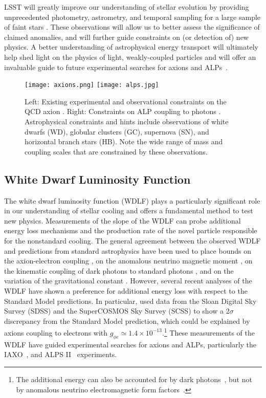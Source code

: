 LSST will greatly improve our understanding of stellar evolution by providing unprecedented photometry, astrometry, and temporal sampling for a large sample of faint stars \citep{0912.0201}.
These observations will allow us to better assess the significance of claimed anomalies, and will further guide constraints on (or detection of) new physics.
A better understanding of astrophysical energy transport will ultimately help shed light on the physics of light, weakly-coupled particles and will offer an invaluable guide to future experimental searches for axions and ALPs~\citep{Irastorza:2018dyq}.

\begin{figure}[t]
\centering
\texttt{[image: axions.png]}
\texttt{[image: alps.jpg]}
\caption{Left: Existing experimental and observational constraints on the QCD axion \citep{Redino:2015}.  
Right: Constraints on ALP coupling to photons \citep{Ringwald:2012}.
Astrophysical constraints and hints include observations of white dwarfs (WD), globular clusters (GC), supernova (SN), and horizontal branch stars (HB).
Note the wide range of mass and coupling scales that are constrained by these observations.
\label{fig:axions}
}
\end{figure}

\subsection{White Dwarf Luminosity Function}

The white dwarf luminosity function (WDLF) plays a particularly significant role in our understanding of stellar cooling and offers a fundamental method to test new physics.
Measurements of the slope of the WDLF can probe additional energy loss mechanisms and the production rate of the novel particle responsible for the nonstandard cooling.
The general agreement between the observed WDLF and predictions from standard astrophysics have been used to place bounds on the axion-electron coupling \citep{Isern:2008nt,Bertolami:2014wua}, on the anomalous neutrino magnetic moment \citep{Bertolami:2014noa}, on the kinematic coupling of dark photons to standard photons \citep{Chang:2016qfl}, and on the variation of the gravitational constant \citep{Althaus:2011ca}.
However, several recent analyses of the WDLF have shown a preference for additional energy loss with respect to the Standard Model predictions.
In particular, \cite{Bertolami:2014wua} used data from the Sloan Digital Sky Survey (SDSS) and the SuperCOSMOS Sky Survey (SCSS) to show a $2 \sigma$ discrepancy from the Standard Model prediction, which could be explained by axions coupling to electrons with $g_{\phi e}\simeq 1.4\times 10^{-13}$.\footnote{The additional energy can also be accounted for by dark photons~\citep{Giannotti:2015kwo,Chang:2016qfl}, but not by anomalous neutrino electromagnetic form factors~\citep{Bertolami:2014noa}.}
These measurements of the WDLF have guided experimental searches for axions and ALPs, particularly the IAXO~\citep{Irastorza:2011gs,Armengaud:2014gea}, and ALPS II~\citep{Bahre:2013ywa,ALPSII} experiments.

